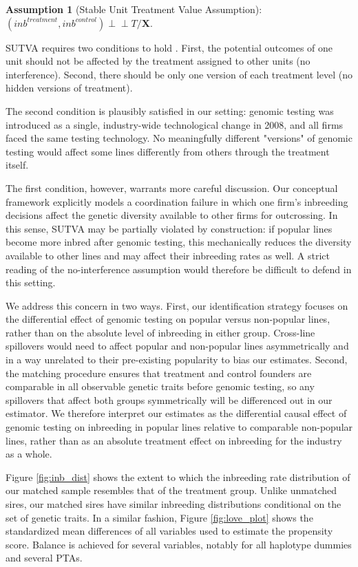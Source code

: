 \documentclass[12pt,letterpaper]{article}
\begin{document}
\medskip
\textbf{Assumption 1} (Stable Unit Treatment Value Assumption): $(inb^{treatment}, inb^{control}) \perp\!\!\!\perp T/\mathbf{X}$.

SUTVA requires two conditions to hold \citep{Imbens2015}. First, the potential outcomes of one unit should not be affected by the treatment assigned to other units (no interference). Second, there should be only one version of each treatment level (no hidden versions of treatment).

The second condition is plausibly satisfied in our setting: genomic testing was introduced as a single, industry-wide technological change in 2008, and all firms faced the same testing technology. No meaningfully different "versions" of genomic testing would affect some lines differently from others through the treatment itself.

The first condition, however, warrants more careful discussion. Our conceptual framework explicitly models a coordination failure in which one firm's inbreeding decisions affect the genetic diversity available to other firms for outcrossing. In this sense, SUTVA may be partially violated by construction: if popular lines become more inbred after genomic testing, this mechanically reduces the diversity available to other lines and may affect their inbreeding rates as well. A strict reading of the no-interference assumption would therefore be difficult to defend in this setting.

We address this concern in two ways. First, our identification strategy focuses on the differential effect of genomic testing on popular versus non-popular lines, rather than on the absolute level of inbreeding in either group. Cross-line spillovers would need to affect popular and non-popular lines asymmetrically and in a way unrelated to their pre-existing popularity to bias our estimates. Second, the matching procedure ensures that treatment and control founders are comparable in all observable genetic traits before genomic testing, so any spillovers that affect both groups symmetrically will be differenced out in our estimator. We therefore interpret our estimates as the differential causal effect of genomic testing on inbreeding in popular lines relative to comparable non-popular lines, rather than as an absolute treatment effect on inbreeding for the industry as a whole.

Figure \ref{fig:inb_dist} shows the extent to which the inbreeding rate distribution of our matched sample resembles that of the treatment group. Unlike unmatched sires, our matched sires have similar inbreeding distributions conditional on the set of genetic traits. In a similar fashion, Figure \ref{fig:love_plot} shows the standardized mean differences of all variables used to estimate the propensity score. Balance is achieved for several variables, notably for all haplotype dummies and several PTAs.
\end{document}
